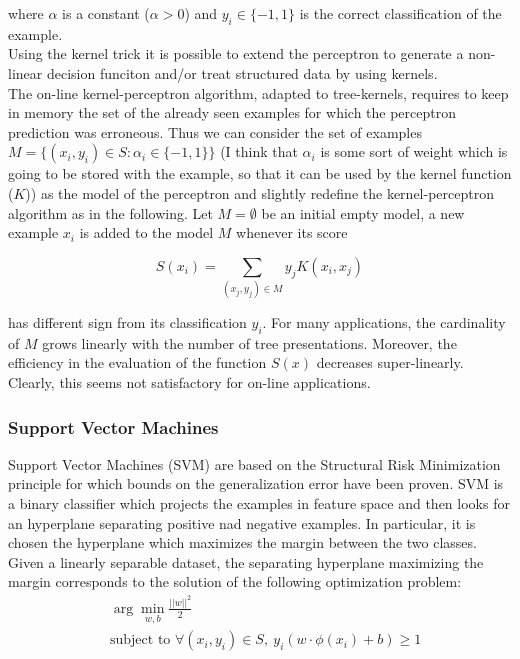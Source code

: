 where $\alpha$ is a constant ($\alpha > 0$) and $y_i \in \{-1, 1\}$ is the
correct classification of the example.\\
Using the kernel trick it is possible to extend the perceptron to generate a
non-linear decision funciton and/or treat structured data by using kernels.\\
The on-line kernel-perceptron algorithm, adapted to tree-kernels, requires to
keep in memory the set of the already seen examples for which the perceptron
prediction was erroneous.
Thus we can consider the set of examples $M = \{(x_i, y_i) \in S : \alpha_i \in 
\{-1, 1\}\}$ (I think that $\alpha_i$ is some sort of weight which is going to
be stored with  the example, so that it can be used by the kernel function ($K$))
as the model of the perceptron and slightly redefine the kernel-perceptron 
algorithm as in the following. 
Let $M = \emptyset$ be an initial empty model, a new example $x_i$ is added to
the model $M$ whenever its score

\begin{equation}
	S(x_i) = \sum_{(x_j, y_j) \in M} y_j K(x_i, x_j)
\end{equation}

has different sign from its classification $y_i$.
For many applications, the cardinality of $M$ grows linearly with the number of
tree presentations. Moreover, the efficiency in the evaluation of the function
$S(x)$ decreases super-linearly. Clearly, this seems not satisfactory for
on-line applications.

\subsubsection{Support Vector Machines}

Support Vector Machines (SVM) are based on the Structural Risk Minimization
principle for which bounds on the generalization error have been proven. SVM is
a binary classifier which projects the examples in feature space and then looks
for an hyperplane separating positive nad negative examples. In particular, it
is chosen the hyperplane which maximizes the margin between the two classes.\\
Given a linearly separable dataset, the separating hyperplane maximizing the
margin corresponds to the solution of the following optimization problem:
\begin{align}
	& \arg \min_{w, b} \frac{||w||^2}{2}  \\
	& \text{subject to } \forall(x_i, y_i) \in S, \ y_i(w \cdot \phi(x_i) + b) \geq 1
\end{align}


